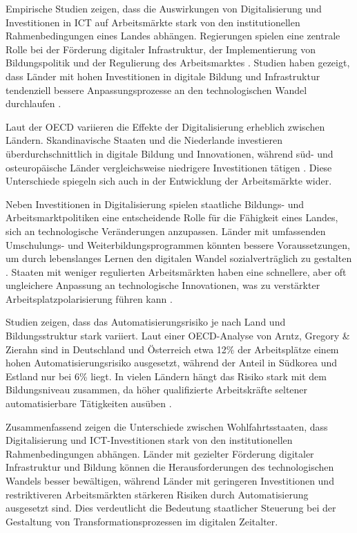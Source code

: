 Empirische Studien zeigen, dass die Auswirkungen von Digitalisierung und Investitionen in
\ac{ICT} auf Arbeitsmärkte stark von den institutionellen Rahmenbedingungen eines Landes 
abhängen. Regierungen spielen eine zentrale Rolle bei der Förderung digitaler Infrastruktur, 
der Implementierung von Bildungspolitik und der Regulierung des 
Arbeitsmarktes \parencite[vgl.][S. 4–5]{hall2001varieties}. Studien haben gezeigt, dass 
Länder mit hohen Investitionen in digitale Bildung und Infrastruktur tendenziell bessere 
Anpassungsprozesse an den technologischen Wandel durchlaufen 
\parencite[vgl.][S. 22–23]{oecd2020digital}.

Laut der \ac{OECD} variieren die Effekte der Digitalisierung erheblich zwischen 
Ländern. Skandinavische Staaten und die Niederlande investieren überdurchschnittlich in 
digitale Bildung und Innovationen, während süd- und osteuropäische Länder vergleichsweise 
niedrigere Investitionen tätigen \parencite[vgl.][S. 24]{oecd2020digital}. Diese 
Unterschiede spiegeln sich auch in der Entwicklung der Arbeitsmärkte wider.

Neben Investitionen in Digitalisierung spielen staatliche Bildungs- und 
Arbeitsmarktpolitiken eine entscheidende Rolle für die Fähigkeit eines Landes, sich an 
technologische Veränderungen anzupassen. Länder mit umfassenden Umschulungs- und 
Weiterbildungsprogrammen könnten bessere Voraussetzungen, um durch lebenslanges Lernen 
den digitalen Wandel sozialverträglich zu gestalten \parencite[vgl.][S. 370–371]{vu2011ict}. 
Staaten mit weniger regulierten Arbeitsmärkten haben eine schnellere, aber oft ungleichere 
Anpassung an technologische Innovationen, was zu verstärkter Arbeitsplatzpolarisierung führen 
kann \parencite[vgl.][S. 27–28]{hall2001varieties}.

Studien zeigen, dass das Automatisierungsrisiko je nach Land und Bildungsstruktur stark 
variiert. Laut einer OECD-Analyse von Arntz, Gregory \& Zierahn sind in Deutschland und 
Österreich etwa 12\% der Arbeitsplätze einem hohen Automatisierungsrisiko ausgesetzt, 
während der Anteil in Südkorea und Estland nur bei 6\% liegt. In vielen Ländern hängt 
das Risiko stark mit dem Bildungsniveau zusammen, da höher qualifizierte Arbeitskräfte 
seltener automatisierbare Tätigkeiten ausüben \parencite[vgl.][S. 15–16]{arntz2016therisk}. 

Zusammenfassend zeigen die Unterschiede zwischen Wohlfahrtsstaaten, dass Digitalisierung 
und \ac{ICT}-Investitionen stark von den institutionellen Rahmenbedingungen abhängen. 
Länder mit gezielter Förderung digitaler Infrastruktur und Bildung können die 
Herausforderungen des technologischen Wandels besser bewältigen, während Länder mit 
geringeren Investitionen und restriktiveren Arbeitsmärkten stärkeren Risiken durch 
Automatisierung ausgesetzt sind. Dies verdeutlicht die Bedeutung staatlicher Steuerung 
bei der Gestaltung von Transformationsprozessen im digitalen Zeitalter.

